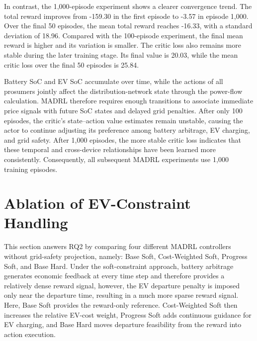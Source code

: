 In contrast, the 1,000-episode experiment shows a clearer convergence trend. The total reward improves from -159.30 in the first episode to -3.57 in episode 1,000. Over the final 50 episodes, the mean total reward reaches -16.33, with a standard deviation of 18.96. Compared with the 100-episode experiment, the final mean reward is higher and its variation is smaller. The critic loss also remains more stable during the later training stage. Its final value is 20.03, while the mean critic loss over the final 50 episodes is 25.84.

Battery SoC and EV SoC accumulate over time, while the actions of all prosumers jointly affect the distribution-network state through the power-flow calculation. MADRL therefore requires enough transitions to associate immediate price signals with future SoC states and delayed grid penalties. After only 100 episodes, the critic's state--action value estimates remain unstable, causing the actor to continue adjusting its preference among battery arbitrage, EV charging, and grid safety. After 1,000 episodes, the more stable critic loss indicates that these temporal and cross-device relationships have been learned more consistently. Consequently, all subsequent MADRL experiments use 1,000 training episodes.

\section{Ablation of EV-Constraint Handling}\label{section:madrlsoft-results}

This section answers RQ2 by comparing four different MADRL controllers without grid-safety projection, namely: Base Soft, Cost-Weighted Soft, Progress Soft, and Base Hard. Under the soft-constraint approach, battery arbitrage generates economic feedback at every time step and therefore provides a relatively dense reward signal, however, the EV departure penalty is imposed only near the departure time, resulting in a much more sparse reward signal. Here, Base Soft provides the reward-only reference. Cost-Weighted Soft then increases the relative EV-cost weight, Progress Soft adds continuous guidance for EV charging, and Base Hard moves departure feasibility from the reward into action execution. 

